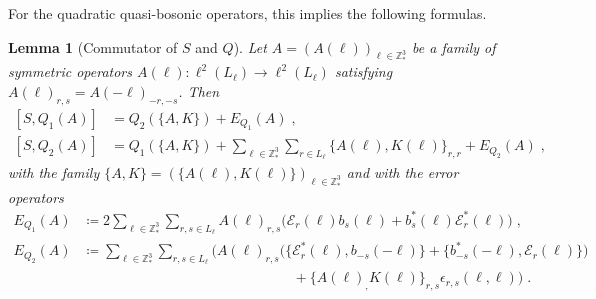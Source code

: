 \documentclass[12pt,a4paper]{article}
\numberwithin{equation}{section}
\newcommand{\1}{\mathbb{I}}
\newcommand{\Z}{\mathbb{Z}}
\theoremstyle{plain}
\newtheorem{lemma}[theorem]{Lemma}
\theoremstyle{definition}
\theoremstyle{remark}
\theoremstyle{plain}
\theoremstyle{definition}
\theoremstyle{remark}
\begin{document}
For the quadratic quasi-bosonic operators, this implies the following formulas.

\begin{lemma}[Commutator of $S$ and $Q$]\label{lem:Q1Kcomm}
Let $ A = (A(\ell))_{\ell \in \Z^3_*} $ be a family of symmetric operators $ A(\ell) : \ell^2(L_\ell) \to \ell^2(L_\ell) $ satisfying $A(\ell)_{r,s} = A(-\ell)_{-r,-s}$. Then
\begin{equation}
\begin{aligned}
	[S, Q_1(A)] 
	&= Q_2(\{A,K\})
		+ E_{Q_1}(A) \;, \\
	[S, Q_2(A)] 
	&= Q_1\left(\{A,K\} \right) 
		+ \sum_{\ell \in \Z^3_*} \sum_{r \in L_{\ell}} \big\{ A(\ell), K(\ell) \big\}_{r,r}
		+ E_{Q_2}(A) \;,
\end{aligned}
\end{equation}
with the family $ \{A,K\} = (\{A(\ell),K(\ell)\})_{\ell \in \Z^3_*} $ and with the error operators
\begin{equation}\label{eq:errKQ}
\begin{aligned}
	E_{Q_1}(A)
	&\coloneq 2 \sum_{\ell \in \Z^3_*}\sum_{r,s \in L_{\ell}}A(\ell)_{r,s}\Big(\mathcal{E}_{r}(\ell)b_{s}(\ell) + b^*_{s}(\ell)\mathcal{E}^*_{r}(\ell)\Big) \;, \\
	E_{Q_2}(A)
	& \coloneq \sum_{\ell \in \Z^3_*}\sum_{r,s \in L_{\ell}}\Big(A(\ell)_{r,s}\big(\big\{\mathcal{E}^*_{r}(\ell), b_{-s}(-\ell)\big\}
		+ \big\{ b^*_{-s}(-\ell) , \mathcal{E}_r(\ell) \big\} \big) \\
		& \hspace{15em}
		+ \big\{A(\ell)_,K(\ell)\big\}_{r,s}\epsilon_{r,s}(\ell,\ell)\Big) \;. \\
\end{aligned} 
\end{equation}
\end{lemma}
\end{document}
